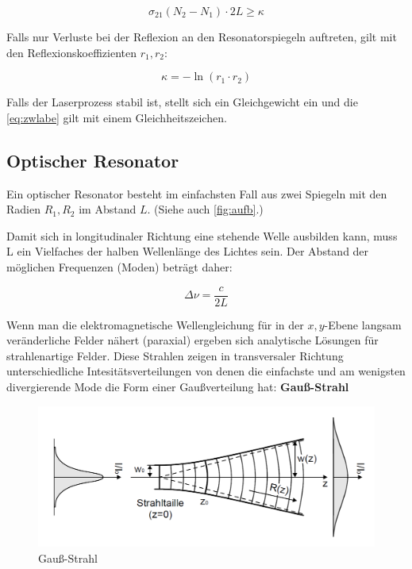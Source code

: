 \documentclass[slug=GL, room=HZDR\ Dresden/Rossendorf\,\ Geb.\ 620/123, supervisor=Tim\ Ziegler]{../../Lab_Report_LaTeX/lab_report}
\begin{document}
\begin{equation}
  \label{eq:zwlabe}
  \tag{zweite Laserbedingung}
  \sigma_{21}(N_2-N_1)\cdot 2L \geq \kappa
\end{equation}

Falls nur Verluste bei der Reflexion an den Resonatorspiegeln
auftreten, gilt mit den Reflexionskoeffizienten \(r_1,r_2\):

\begin{equation}
  \label{eq:kappa}
  \kappa = - \ln(r_1\cdot r_2)
\end{equation}

Falls der Laserprozess stabil ist, stellt sich ein Gleichgewicht ein
und die \ref{eq:zwlabe} gilt mit einem Gleichheitszeichen.

\subsection{Optischer Resonator}
\label{sec:reso}

Ein optischer Resonator besteht im einfachsten Fall aus zwei Spiegeln
mit den Radien \(R_1,R_2\) im Abstand \(L\). (Siehe auch
\ref{fig:aufb}.)

Damit sich in longitudinaler Richtung eine stehende Welle ausbilden
kann, muss L ein Vielfaches der halben Wellenl\"ange des Lichtes sein.
Der Abstand der m\"oglichen Frequenzen (Moden) betr\"agt daher:

\begin{equation}
  \label{eq:longmodes}
  \Delta\nu = \frac{c}{2L}
\end{equation}

Wenn man die elektromagnetische Wellengleichung f\"ur in der
\(x,y\)-Ebene langsam ver\"anderliche Felder n\"ahert (paraxial)
ergeben sich analytische L\"osungen f\"ur strahlenartige Felder.
Diese Strahlen zeigen in transversaler Richtung unterschiedliche
Intesit\"atsverteilungen von denen die einfachste und am wenigsten
divergierende Mode die Form einer Gaußverteilung hat:
\textbf{Gau\ss{}-Strahl}

\begin{figure}[H]\centering
  \includegraphics[width=.5\columnwidth]{gauss-strahl.png}
  \caption[Gauss]{Gau\ss{}-Strahl }
  \label{fig:gauss}
\end{figure}
\end{document}
